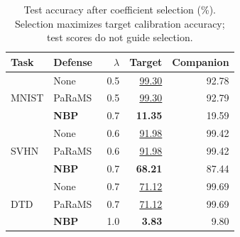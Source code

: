 \begin{table}[!htbp]
\centering
\small
\setlength{\tabcolsep}{4pt}
\caption{Test accuracy after coefficient selection (\%). Selection maximizes target calibration accuracy; test scores do not guide selection.}
\label{tab:coefficient-selection-target}
\begin{tabular}{llrrr}
\toprule
Task & Defense & $\lambda$ & Target & Companion \\
\midrule
\multirow{3}{*}{MNIST} & None & 0.5 & \underline{99.30} & 92.78 \\
 & PaRaMS~\cite{wei2025params} & 0.5 & \underline{99.30} & 92.79 \\
 & \textbf{NBP} & 0.7 & \textbf{11.35} & 19.59 \\
\midrule
\multirow{3}{*}{SVHN} & None & 0.6 & \underline{91.98} & 99.42 \\
 & PaRaMS~\cite{wei2025params} & 0.6 & \underline{91.98} & 99.42 \\
 & \textbf{NBP} & 0.7 & \textbf{68.21} & 87.44 \\
\midrule
\multirow{3}{*}{DTD} & None & 0.7 & \underline{71.12} & 99.69 \\
 & PaRaMS~\cite{wei2025params} & 0.7 & \underline{71.12} & 99.69 \\
 & \textbf{NBP} & 1.0 & \textbf{3.83} & 9.80 \\
\bottomrule
\end{tabular}
\end{table}
